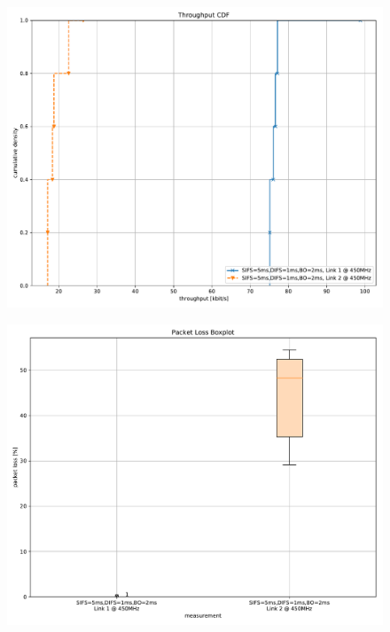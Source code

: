 \documentclass{article}
\begin{document}
\begin{figure}
	\includegraphics[width=\textwidth]{rb_low_dual/cdf/throughput_cdf}
\end{figure}

\begin{figure}
	\includegraphics[width=\textwidth]{rb_low_dual/boxplot/packet_loss_boxplot}
\end{figure}
\end{document}
